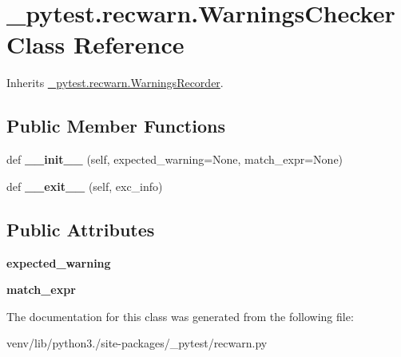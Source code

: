 \hypertarget{class__pytest_1_1recwarn_1_1_warnings_checker}{}\section{\+\_\+pytest.\+recwarn.\+Warnings\+Checker Class Reference}
\label{class__pytest_1_1recwarn_1_1_warnings_checker}


Inherits \hyperlink{class__pytest_1_1recwarn_1_1_warnings_recorder}{\+\_\+pytest.\+recwarn.\+Warnings\+Recorder}.

\subsection*{Public Member Functions}
\begin{DoxyCompactItemize}
\item 
\mbox{\label{class__pytest_1_1recwarn_1_1_warnings_checker_a1833281179aa360988ec2a1a80422754}} 
def {\bfseries \+\_\+\+\_\+init\+\_\+\+\_\+} (self, expected\+\_\+warning=None, match\+\_\+expr=None)
\item 
\mbox{\label{class__pytest_1_1recwarn_1_1_warnings_checker_aa5837ed2e5c396f1f352c5684271b194}} 
def {\bfseries \+\_\+\+\_\+exit\+\_\+\+\_\+} (self, exc\+\_\+info)
\end{DoxyCompactItemize}
\subsection*{Public Attributes}
\begin{DoxyCompactItemize}
\item 
\mbox{\label{class__pytest_1_1recwarn_1_1_warnings_checker_a55ae599163d76cab2e4391e2d523e710}} 
{\bfseries expected\+\_\+warning}
\item 
\mbox{\label{class__pytest_1_1recwarn_1_1_warnings_checker_ac8eb0784e8796f0f76c6fcd34a3921ea}} 
{\bfseries match\+\_\+expr}
\end{DoxyCompactItemize}


The documentation for this class was generated from the following file\+:\begin{DoxyCompactItemize}
\item 
venv/lib/python3./site-\/packages/\+\_\+pytest/recwarn.\+py\end{DoxyCompactItemize}

